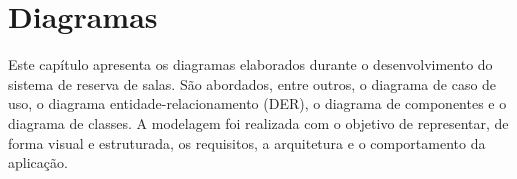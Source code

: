 \chapter{Diagramas}\label{sec:2}

Este capítulo apresenta os diagramas elaborados durante o desenvolvimento do sistema de reserva de salas. São abordados, entre outros, o diagrama de caso de uso, o diagrama entidade-relacionamento (DER), o diagrama de componentes e o diagrama de classes. A modelagem foi realizada com o objetivo de representar, de forma visual e estruturada, os requisitos, a arquitetura e o comportamento da aplicação.








